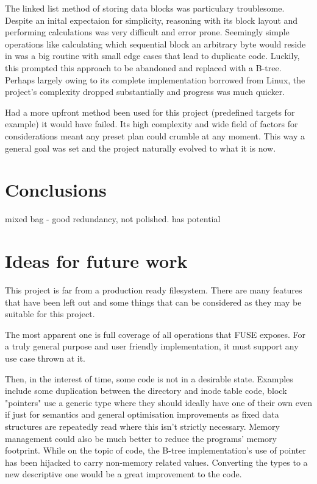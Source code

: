         The linked list method of storing data blocks was particulary
        troublesome. Despite an inital expectaion for simplicity, reasoning
        with its block layout and performing calculations was very difficult
        and error prone. Seemingly simple operations like calculating which
        sequential block an arbitrary byte would reside in was a big routine
        with small edge cases that lead to duplicate code. Luckily, this
        prompted this approach to be abandoned and replaced with a B-tree.
        Perhaps largely owing to its complete implementation borrowed from
        Linux, the project's complexity dropped substantially and progress was
        much quicker.

        Had a more upfront method been used for this project (predefined
        targets for example) it would have failed. Its high complexity and wide
        field of factors for considerations meant any preset plan could crumble
        at any moment. This way a general goal was set and the project
        naturally evolved to what it is now.

    \section{Conclusions}

        mixed bag - good redundancy, not polished. has potential

    \section{Ideas for future work}

        This project is far from a production ready filesystem. There are many
        features that have been left out and some things that can be considered
        as they may be suitable for this project.

        The most apparent one is full coverage of all operations that FUSE
        exposes. For a truly general purpose and user friendly implementation,
        it must support any use case thrown at it.

        Then, in the interest of time, some code is not in a desirable state.
        Examples include some duplication between the directory and inode table
        code, block "pointers" use a generic type where they should ideally
        have one of their own even if just for semantics and general
        optimisation improvements as fixed data structures are repeatedly read
        where this isn't strictly necessary. Memory management could also be
        much better to reduce the programs' memory footprint. While on the
        topic of code, the B-tree implementation's use of pointer has been
        hijacked to carry non-memory related values. Converting the types to a
        new descriptive one would be a great improvement to the code.

